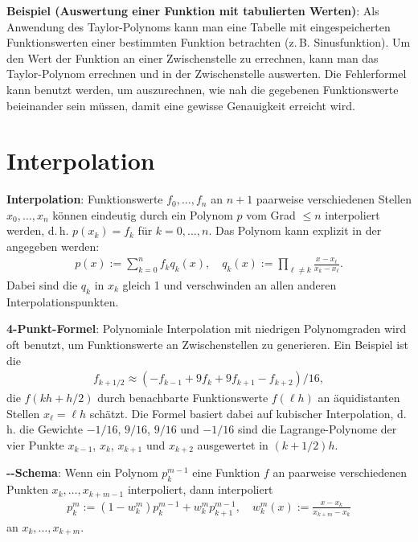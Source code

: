 \linie

\textbf{Beispiel (Auswertung einer Funktion mit tabulierten Werten)}:
Als Anwendung des Taylor-Polynoms kann man eine Tabelle mit eingespeicherten
Funktionswerten einer bestimmten Funktion betrachten (z.\,B. Sinusfunktion).
Um den Wert der Funktion an einer Zwischenstelle zu errechnen, kann man das Taylor-Polynom
errechnen und in der Zwischenstelle auswerten.
Die Fehlerformel kann benutzt werden, um auszurechnen, wie nah die gegebenen Funktionswerte
beieinander sein müssen, damit eine gewisse Genauigkeit erreicht wird.

\pagebreak

\section{%
    Interpolation%
}

\textbf{Interpolation}:
Funktionswerte $f_0, \dotsc, f_n$ an $n + 1$ paarweise verschiedenen Stellen $x_0, \dotsc, x_n$
können eindeutig durch ein Polynom $p$ vom Grad $\le n$ interpoliert werden,
d.\,h. $p(x_k) = f_k$ für $k = 0, \dotsc, n$.
Das Polynom kann explizit in der  angegeben werden:
\begin{align*}
    p(x) := \sum_{k=0}^n f_k q_k(x),\quad
    q_k(x) := \prod_{\ell\not=k} \frac{x - x_\ell}{x_k - x_\ell}.
\end{align*}
Dabei sind die  $q_k$ in $x_k$ gleich 1 und verschwinden an
allen anderen Interpolationspunkten.

\linie

\textbf{4-Punkt-Formel}:
Polynomiale Interpolation mit niedrigen Polynomgraden wird oft benutzt, um Funktionswerte
an Zwischenstellen zu generieren.
Ein Beispiel ist die 
\begin{align*}
    f_{k+1/2} \approx (-f_{k-1} + 9f_k + 9f_{k+1} - f_{k+2})/16,
\end{align*}
die $f(kh + h/2)$ durch benachbarte Funktionswerte $f(\ell h)$ an äquidistanten Stellen
$x_\ell = \ell h$ schätzt.
Die Formel basiert dabei auf kubischer Interpolation,
d.\,h. die Gewichte $-1/16$, $9/16$, $9/16$ und $-1/16$ sind die Lagrange-Polynome
der vier Punkte $x_{k-1}$, $x_k$, $x_{k+1}$ und $x_{k+2}$ ausgewertet in $(k + 1/2)h$.

\linie

\textbf{--Schema}:
Wenn ein Polynom $p_k^{m-1}$ eine Funktion $f$ an paarweise verschiedenen Punkten
$x_k, \dotsc, x_{k+m-1}$ interpoliert, dann interpoliert
\begin{align*}
    p_k^m := (1 - w_k^m) p_k^{m-1} + w_k^m p_{k+1}^{m-1},\quad
    w_k^m(x) := \frac{x - x_k}{x_{k+m} - x_k}
\end{align*}
an $x_k, \dotsc, x_{k+m}$.

